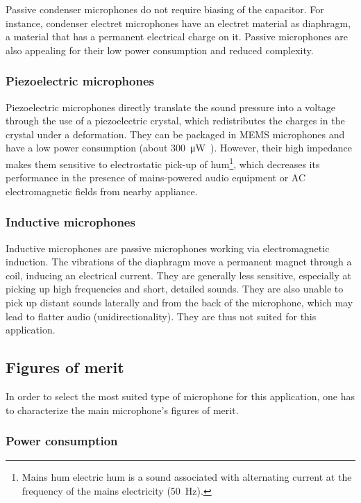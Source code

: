 \documentclass{EPL-master-thesis-covers-EN}
\begin{document}
Passive condenser microphones do not require biasing of the capacitor. For instance, condenser electret microphones have an electret material as diaphragm, a material that has a permanent electrical charge on it. Passive microphones are also appealing for their low power consumption and reduced complexity.
 
\subsubsection*{Piezoelectric microphones}

Piezoelectric microphones directly translate the sound pressure into a voltage through the use of a piezoelectric crystal, which redistributes the charges in the crystal under a deformation. They can be packaged in MEMS microphones and have a low power consumption (about \SI{300}{\micro W}~\cite{PMM-3738-VM1000-R}). However, their high impedance makes them sensitive to electrostatic pick-up of hum\footnote{Mains hum electric hum is a sound associated with alternating current at the frequency of the mains electricity (\SI{50}{Hz}).}, which decreases its performance in the presence of mains-powered audio equipment or AC electromagnetic fields from nearby appliance.

\subsubsection*{Inductive microphones}

Inductive microphones are passive microphones working via electromagnetic induction. The vibrations of the diaphragm move a permanent magnet through a coil, inducing an electrical current. They are generally less sensitive, especially at picking up high frequencies and short, detailed sounds. They are also unable to pick up distant sounds laterally and from the back of the microphone, which may lead to flatter audio (unidirectionality). They are thus not suited for this application.


\subsection*{Figures of merit}

In order to select the most suited type of microphone for this application, one has to characterize the main microphone's figures of merit.

\subsubsection*{Power consumption}
\end{document}
